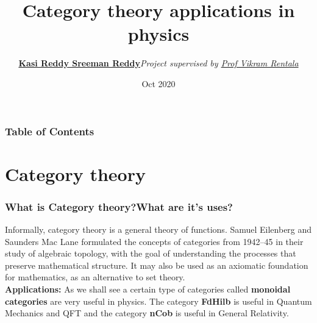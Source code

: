 \documentclass[11pt]{beamer}
\author[K. Sreeman Reddy]{\href{http://iamsreeman.github.io/}{\textbf{Kasi Reddy Sreeman Reddy}}\linebreak\text{Undergraduate student}\linebreak\textit{Project supervised by {\href{https://www.phy.iitb.ac.in/en/employee-profile/vikram-rentala}{\normalfont Prof Vikram Rentala}}}}
\title{Category theory
applications in physics}
\institute[]{IIT Bombay}
\date{Oct 2020}
\begin{document}
\begin{frame}
\titlepage
\end{frame}
\begin{frame}
\frametitle{Table of Contents}
\tableofcontents
\end{frame}


\section{Category theory}
\begin{frame}

\frametitle{What is Category theory?What are it's uses?}
Informally, category theory is a general theory of functions. Samuel Eilenberg and Saunders Mac Lane formulated the concepts of categories from 1942–45 in their study of algebraic topology, with the goal of understanding the processes that preserve mathematical structure. It may also be used as an axiomatic foundation for mathematics, as an alternative to set theory.\\
\textbf{Applications:} As we shall see a certain type of categories called \textbf{monoidal categories} are very useful in physics. The category \textbf{FdHilb} is useful in Quantum Mechanics and QFT and the category \textbf{nCob} is useful in General Relativity.
\end{frame}
\end{document}
